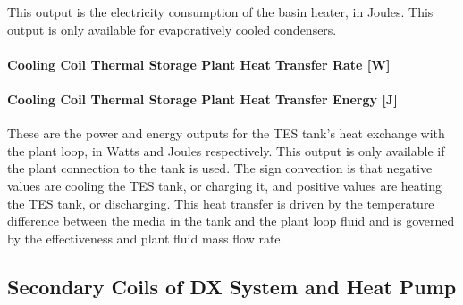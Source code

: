 This output is the electricity consumption of the basin heater, in Joules. This output is only available for evaporatively cooled condensers.

\paragraph{Cooling Coil Thermal Storage Plant Heat Transfer Rate {[}W{]}}\label{cooling-coil-thermal-storage-plant-heat-transfer-rate-w}

\paragraph{Cooling Coil Thermal Storage Plant Heat Transfer Energy {[}J{]}}\label{cooling-coil-thermal-storage-plant-heat-transfer-energy-j}

These are the power and energy outputs for the TES tank's heat exchange with the plant loop, in Watts and Joules respectively. This output is only available if the plant connection to the tank is used. The sign convection is that negative values are cooling the TES tank, or charging it, and positive values are heating the TES tank, or discharging. This heat transfer is driven by the temperature difference between the media in the tank and the plant loop fluid and is governed by the effectiveness and plant fluid mass flow rate.

\subsection{Secondary Coils of DX System and Heat Pump}\label{secondary-coils-of-dx-system-and-heat-pump}

